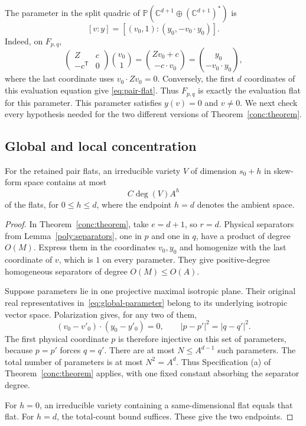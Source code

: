 The parameter in the split quadric of
\(\mathbb P(\mathbb C^{d+1}\oplus(\mathbb C^{d+1})^*)\) is
\begin{equation}\label{eq:global-parameter}
 [v:y]=[(v_0,1):(y_0,-v_0\cdot y_0)].
\end{equation}
Indeed, on \(F_{p,q}\),
\[
 \begin{pmatrix}Z&c\\-c^{\mathsf T}&0\end{pmatrix}
 \binom{v_0}{1}
 =\binom{Zv_0+c}{-c\cdot v_0}
 =\binom{y_0}{-v_0\cdot y_0},
\]
where the last coordinate uses \(v_0\cdot Zv_0=0\). Conversely, the
first \(d\) coordinates of this evaluation equation give
\eqref{eq:pair-flat}. Thus \(F_{p,q}\) is exactly the evaluation flat
for this parameter. This parameter satisfies \(y(v)=0\) and \(v\ne0\).
We next check every hypothesis needed for the two different versions
of Theorem~\ref{conc:theorem}.

\subsection{Global and local concentration}

\begin{lemma}\label{red:global-concentration}
For the retained pair flats, an irreducible variety \(V\) of dimension
\(s_0+h\) in skew-form space contains at most
\[
 C\deg(V)A^h
\]
of the flats, for \(0\le h\le d\), where the endpoint \(h=d\)
denotes the ambient space.
\end{lemma}

\begin{proof}
In Theorem~\ref{conc:theorem}, take \(e=d+1\), so \(r=d\).
Physical separators from Lemma~\ref{poly:separators}, one in \(p\)
and one in \(q\), have a product of degree \(O(M)\). Express them
in the coordinates \(v_0,y_0\) and homogenize with the last coordinate
of \(v\), which is \(1\) on every parameter. They give positive-degree
homogeneous separators of degree \(O(M)\le O(A)\).

Suppose parameters lie in one projective maximal isotropic plane.
Their original real representatives in~\eqref{eq:global-parameter}
belong to its underlying isotropic vector space. Polarization gives,
for any two of them,
\[
 (v_0-v'_0)\cdot(y_0-y'_0)=0,\qquad
 |p-p'|^2=|q-q'|^2.
\]
The first physical coordinate \(p\) is therefore injective on this
set of parameters, because \(p=p'\) forces \(q=q'\).
There are at most \(N\le A^{d-1}\) such parameters.
The total number of parameters is at most \(N^2=A^d\).
Thus Specification (a) of Theorem~\ref{conc:theorem} applies, with one
fixed constant absorbing the separator degree.

For \(h=0\), an irreducible variety containing a same-dimensional
flat equals that flat. For \(h=d\), the total-count bound suffices.
These give the two endpoints.
\end{proof}

